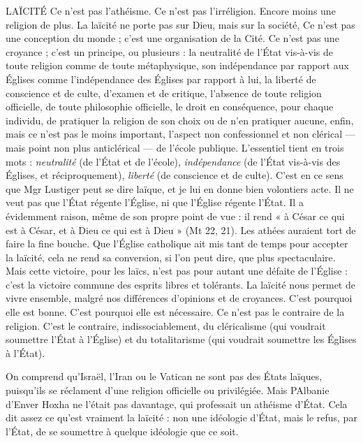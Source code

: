 {%
LAÏCITÉ Ce n’est pas l’athéisme. Ce n’est pas l’irréligion. Encore moins
une religion de plus. La laïcité ne porte pas sur Dieu, mais sur la
société, Ce n’est pas une conception du monde ; c’est une organisation de la
Cité. Ce n’est pas une croyance ; c’est un principe, ou plusieurs : la neutralité
de l’État vis-à-vis de toute religion comme de toute métaphysique, son indépendance
par rapport aux Églises comme l'indépendance des Églises par rapport
à lui, la liberté de conscience et de culte, d'examen et de critique, l’absence
de toute religion officielle, de toute philosophie officielle, le droit en conséquence,
pour chaque individu, de pratiquer la religion de son choix ou de n’en
pratiquer aucune, enfin, mais ce n’est pas le moins important, l’aspect non
confessionnel et non clérical — mais point non plus anticlérical — de l’école
publique. L'essentiel tient en trois mots : {\it neutralité} (de l’État et de l’école),
{\it indépendance} (de l'État vis-à-vis des Églises, et réciproquement), {\it liberté} (de
conscience et de culte). C’est en ce sens que Mgr Lustiger peut se dire laïque,
et je lui en donne bien volontiers acte. Il ne veut pas que l'État régente l’Église,
ni que l’Église régente l'État. Il a évidemment raison, même de son propre
point de vue : il rend « à César ce qui est à César, et à Dieu ce qui est à Dieu »
(Mt 22, 21). Les athées auraient tort de faire la fine bouche. Que l'Église catholique
ait mis tant de temps pour accepter la laïcité, cela ne rend sa conversion,
si l’on peut dire, que plus spectaculaire. Mais cette victoire, pour les laïcs, n’est
pas pour autant une défaite de l’Église : c’est la victoire commune des esprits
libres et tolérants. La laïcité nous permet de vivre ensemble, malgré nos différences
d'opinions et de croyances. C’est pourquoi elle est bonne. C’est pourquoi
elle est nécessaire. Ce n’est pas le contraire de la religion. C’est le
contraire, indissociablement, du cléricalisme (qui voudrait soumettre l’État à
l'Église) et du totalitarisme (qui voudrait soumettre les Églises à l'État).

On comprend qu'Israël, l'Iran ou le Vatican ne sont pas des États laïques,
puisqu'ils se réclament d’une religion officielle ou privilégiée. Mais PAlbanie
d’Enver Hoxha ne l'était pas davantage, qui professait un athéisme d’État. Cela
dit assez ce qu’est vraiment la laïcité : non une idéologie d’État, mais le refus,
par l’État, de se soumettre à quelque idéologie que ce soit.

}
